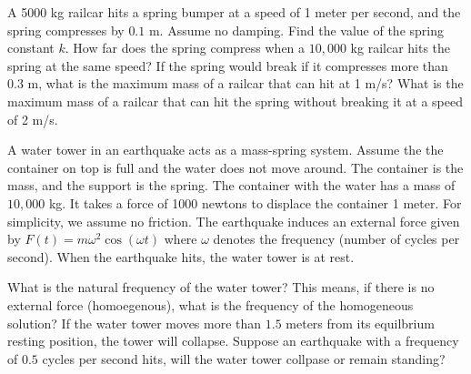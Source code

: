 \newpage

\ii A 5000 kg railcar hits a spring bumper at a speed of 1 meter per second, and the spring compresses by $0.1$ m. Assume no damping.
\bb
\ii Find the value of the spring constant $k$.
\ii How far does the spring compress when a $10,\!000$ kg railcar hits the spring at the same speed?
\ii If the spring would break if it compresses more than $0.3$ m, what is the maximum mass of a railcar that can hit at 1 m/s?
\ii What is the maximum mass of a railcar that can hit the spring without breaking it at a speed of 2 m/s.
\ee


\newpage



\ii A water tower in an earthquake acts as a mass-spring system. Assume the the container on top is full and the water does not move around. The container is the mass, and the support is the spring. The container with the water has a mass of $10,\!000$ kg. It takes a force of 1000 newtons to displace the container 1 meter. For simplicity, we assume no friction. The earthquake induces an external force given by $F(t)=m\omega^2\cos{(\omega t)}$ where $\omega$ denotes the frequency (number of cycles per second). When the earthquake hits, the water tower is at rest.

\bb
\ii What is the natural frequency of the water tower? This means, if there is no external force (homoegenous), what is the frequency of the homogeneous solution?
\ii If the water tower moves more than $1.5$ meters from its equilbrium resting position, the tower will collapse. Suppose an earthquake with a frequency of $0.5$ cycles per second hits, will the water tower collpase or remain standing?
\ee

\ee
